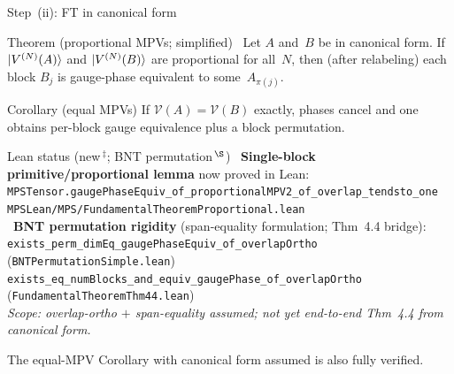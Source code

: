 \documentclass[aspectratio=169,10pt]{beamer}
\begin{document}
\begin{frame}{Step~(ii): FT in canonical form}
    \vspace{-0.6em}

    \begin{block}{Theorem (proportional MPVs; simplified)~\cite{Cirac2017Annals,Cirac2021Matrix}}
        Let $A$ and~$B$ be in canonical form.
        If $\ket{V^{(N)}(A)}$ and $\ket{V^{(N)}(B)}$ are proportional for all~$N$,
        then (after relabeling) each block $B_j$ is gauge-phase equivalent
        to some~$A_{\pi(j)}$.
    \end{block}

    \begin{block}{Corollary (equal MPVs)}
        If $\mathcal{V}(A)=\mathcal{V}(B)$ exactly, phases cancel
        and one obtains per-block gauge equivalence plus a block permutation.
    \end{block}

    \begin{block}{Lean status (new\,$^{\ddagger}$; BNT permutation\,$^{\S}$)}
        {\scriptsize
        \textcolor{leangreen}{\checkmark}~\textbf{Single-block primitive/proportional lemma}
          now proved in Lean:\\[0.05em]
        \quad\texttt{MPSTensor.gaugePhaseEquiv\_of\_proportionalMPV2\_of\_overlap\_tendsto\_one}\\
        \quad\textcolor{dimwhite}{\texttt{MPSLean/MPS/FundamentalTheoremProportional.lean}}\\[0.2em]
        \textcolor{leangreen}{\checkmark}~\textbf{BNT permutation rigidity}
          (span-equality formulation; Thm~4.4 bridge):\\[0.05em]
        \quad\texttt{exists\_perm\_dimEq\_gaugePhaseEquiv\_of\_overlapOrtho}
          \textcolor{dimwhite}{(\texttt{BNTPermutationSimple.lean})}\\
        \quad\texttt{exists\_eq\_numBlocks\_and\_equiv\_gaugePhase\_of\_overlapOrtho}
          \textcolor{dimwhite}{(\texttt{FundamentalTheoremThm44.lean})}\\[0.2em]
        \textcolor{dimwhite}{\emph{Scope: overlap-ortho $+$ span-equality assumed;
            not yet end-to-end Thm~4.4 from canonical form.}}}
    \end{block}
    \textcolor{dimwhite}{\footnotesize The equal-MPV Corollary with canonical form assumed is also fully verified.}
\end{frame}
\end{document}
